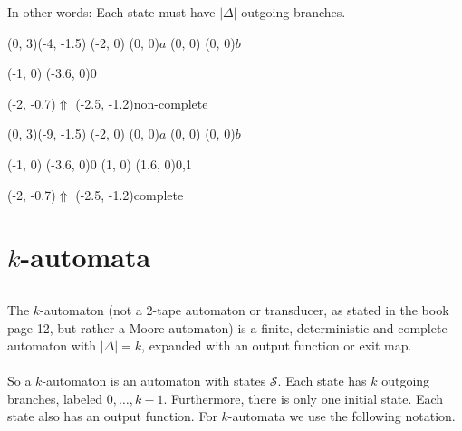 \documentclass{article}
\begin{document}
In other words: Each state must have $|\Delta|$ outgoing branches.\\
\begin{graph}(0, 3)(-4, -1.5)
  (-2, 0) (0, 0){$a$}
  (0, 0) (0, 0){$b$}

  (-1, 0) \freetext(-3.6, 0){0}
   

  \freetext(-2, -0.7){$\Uparrow$}
  \freetext(-2.5, -1.2){non-complete}
\end{graph}
\begin{graph}(0, 3)(-9, -1.5)
  (-2, 0) (0, 0){$a$}
  (0, 0) (0, 0){$b$}

  (-1, 0) \freetext(-3.6, 0){0}
  (1, 0) \freetext(1.6, 0){0,1}
   

  \freetext(-2, -0.7){$\Uparrow$}
  \freetext(-2.5, -1.2){complete}
\end{graph}

\section{$k$-automata}
\subsection{}
The $k$-automaton (not a 2-tape automaton or transducer, as stated in the
book \cite{Fogg} page 12, but rather a Moore automaton) is a finite, 
deterministic and complete automaton with $|\Delta| = k$, expanded with an 
output function or exit map.\\
\\
So a $k$-automaton is an automaton with states $\mathcal{S}$. Each state has
$k$ outgoing branches, labeled $0, \ldots, k - 1$. Furthermore, there is only
one initial state. Each state also has an output function. For $k$-automata
we use the following notation.\\
\end{document}
